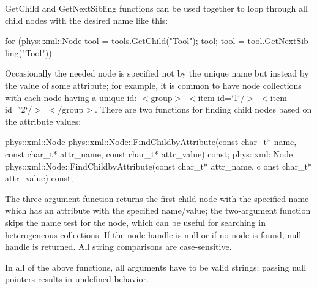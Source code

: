  \par
 GetChild and GetNextSibling functions can be used together to loop through all child nodes with the desired name like this: 
\begin{DoxyCode}
 for (phys::xml::Node tool = tools.GetChild("Tool"); tool; tool = tool.GetNextSib
      ling("Tool"))
     {}
\end{DoxyCode}
 Occasionally the needed node is specified not by the unique name but instead by the value of some attribute; for example, it is common to have node collections with each node having a unique id: $<$group$>$ $<$item id=\char`\"{}1\char`\"{}/$>$ $<$item id=\char`\"{}2\char`\"{}/$>$ $<$/group$>$. There are two functions for finding child nodes based on the attribute values: 
\begin{DoxyCode}
 phys::xml::Node phys::xml::Node::FindChildbyAttribute(const char_t* name, const 
      char_t* attr_name, const char_t* attr_value) const;
 phys::xml::Node phys::xml::Node::FindChildbyAttribute(const char_t* attr_name, c
      onst char_t* attr_value) const;
\end{DoxyCode}
 The three-\/argument function returns the first child node with the specified name which has an attribute with the specified name/value; the two-\/argument function skips the name test for the node, which can be useful for searching in heterogeneous collections. If the node handle is null or if no node is found, null handle is returned. All string comparisons are case-\/sensitive. \par
 \par
 In all of the above functions, all arguments have to be valid strings; passing null pointers results in undefined behavior.

